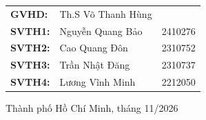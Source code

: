 \documentclass[a4paper]{article}
\begin{document}
\begin{titlepage}
\begin{center}
    \begin{tabular}{lll}
    \Large \bf GVHD: & \Large Th.S Võ Thanh Hùng & 
    \vspace{0.2cm}\\
    \Large \bf SVTH1:  &\Large Nguyễn Quang Bảo &\Large 2410276\\
    \Large \bf SVTH2:  &\Large Cao Quang Đôn &\Large 2310752 \\
    \Large \bf SVTH3:  &\Large Trần Nhật Đăng &\Large 2310737 \\
    \Large \bf SVTH4:  &\Large Lương Vĩnh Minh &\Large 2212050 \\
    \end{tabular}
    \end{center}
    \vfill
    \vspace{0.5cm}
    \begin{center}
    {\large Thành phố Hồ Chí Minh, tháng 11/2026}
\end{center}
\end{titlepage}


\newpage

\clearpage
\setcounter{page}{1} %

\newpage
\tableofcontents
\newpage
\listoffigures

\listoftables
\newpage



\newpage



\newpage


\end{document}
